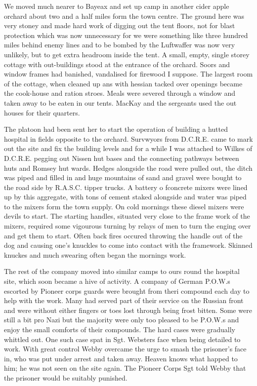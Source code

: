 
We moved much nearer to Bayeax and set up camp in another cider apple
orchard about two and a half miles form the town centre. The ground
here was very stoney and made hard work of digging out the tent
floors, not for blast protection which was now unnecessary for we were
something like three hundred miles behind enemy lines and to be bombed
by the Luftwaffer was now very unlikely, but to get extra headroom
inside the tent. A small, empty, single storey cottage with
out-buildings stood at the entrance of the orchard. Soors and window
frames had banished, vandalised for firewood I suppose. The largest
room of the cottage, when cleaned up ans with hessian tacked over
openings became the cook-house and ration stroes. Meals were severed
through a window and taken away to be eaten in our tents. \Lieutenant MacKay
and the sergeants used the out houses for their quarters.

The platoon had been sent her to start the operation of building a
hutted hospital in fields opposite to the orchard. Survwyors from
D.C.R.E. came to mark out the site and fix the building levels and for
a while I was attached to \corporal Wilkes of D.C.R.E. pegging out
Nissen hut bases and the connecting pathways between huts and Romsey
hut wards. Hedges alongside the road were pulled out, the ditch was
piped and filled in and huge mountains of sand and gravel were bought
to the road side by R.A.S.C. tipper trucks. A battery o fconcrete
mixers were lined up by this aggregate, with tons of cement staked
alongside and water was piped to the mixers form the town supply. On
cold mornings these diesel mixers were devils to start. The starting
handles, situated very close to the frame work of the mixers, required
some vigourous turning by relays of men to turn the enging over and
get them to start. Often back fires occured throwing the handle out of
the dog and causing one's knuckles to come into contact with the
framework. Skinned knuckes and much swearing often began the mornings
work.

The rest of the company moved into similar camps to ours round the
hospital site, which soon became a hive of activity. A company of
German P.O.W.s escorted by Pioneer corps guards were brought from
theri compound each day to help with the work. Many had served part of
their service on the Russian front and were without either fingers or
toes lost through being frost bitten. Some were still a bit pro Nazi
but the majority were only too pleased to be P.O.W.s and enjoy the
small comforts of their compounds. The hard cases were gradually
whittled out. One such case spat in Sgt. Websters face when being
detailed to work. With great control Webby overcame the urge to smash
the prisoner's face in, who was put under arrest and taken
away. Heaven knows what happed to him; he was not seen on the site
again. The Pioneer Corps Sgt told Webby that the prisoner would be
suitably punished.

